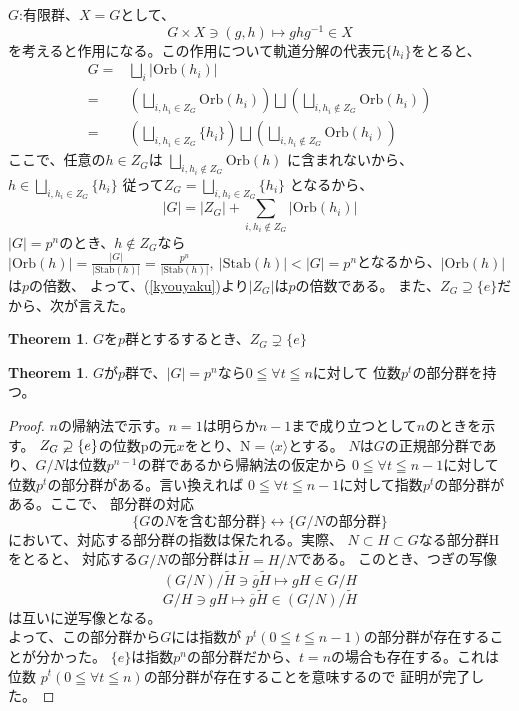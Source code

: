 \documentclass{ltjsarticle}
\theoremstyle{definition}
\newtheorem{theorem}[definition]{Theorem}
\begin{document}
$G$:有限群、$X=G$として、
\[ G\times X\ni (g,h)\longmapsto ghg^{-1}\in X\]
を考えると作用になる。この作用について軌道分解の代表元$\{h_i\}$をとると、
\begin{align*}
             G=&\bigsqcup _{i}\left|\mathrm{Orb}(h_i)\right|\\
              =&\left(\bigsqcup _{i,h_i\in Z_G}\mathrm{Orb}(h_i)\right)\bigsqcup
              \left(\bigsqcup _{i,h_i\notin Z_G}\mathrm{Orb}(h_i)\right)\\
              =&\left(\bigsqcup _{i,h_i\in Z_G}\{h_i\}\right)\bigsqcup 
              \left(\bigsqcup _{i,h_i\notin Z_G}\mathrm{Orb}(h_i)\right)
\end{align*}
ここで、任意の$h\in Z_{G}$は
$\bigsqcup _{i,h_i\notin Z_G}\mathrm{Orb}(h)$
に含まれないから、$h\in\bigsqcup _{i,h_i\in Z_G}\{h_i\}$
従って$Z_{G}=\bigsqcup _{i,h_i\in Z_G}\{h_i\}$
となるから、
\begin{equation}\label{kyouyaku}
    |G|=|Z_{G}|
              +\sum_{i,h_i\notin Z_G}\left|\mathrm{Orb}(h_i)\right|
\end{equation}
$|G|=p^n$のとき、$h\notin Z_G$なら
$\left|\mathrm{Orb}(h)\right|
=\frac{|G|}{|\mathrm{Stab}(h)|}=\frac{p^n}{|\mathrm{Stab}(h)|},\>
\left|\mathrm{Stab}(h)\right|< |G|=p^n$となるから、$|\mathrm{Orb}(h)|$は$p$の倍数、
よって、(\ref{kyouyaku})より$|Z_G|$は$p$の倍数である。
また、$Z_G\supseteq \{e\}$だから、次が言えた。
\begin{theorem}
  $G$を$p$群とするするとき、$Z_G\supsetneq \{e\}$
\end{theorem}
\begin{theorem}\label{pgrp}
  $G$が$p$群で、$|G|=p^n$なら$0\leqq\forall t\leqq n$に対して
  位数$p^t$の部分群を持つ。
\end{theorem}
\begin{proof}
 $n$の帰納法で示す。$n=1$は明らか$n-1$まで成り立つとして$n$のときを示す。
  $Z_G\varsupsetneq \{e\}$の位数pの元$x$をとり、$\mathrm{N}=\langle x\rangle$とする。
  $N$は$G$の正規部分群であり、$G/N$は位数$p^{n-1}$の群であるから帰納法の仮定から
  $0\leqq\forall t\leqq n-1$に対して位数$p^t$の部分群がある。言い換えれば
  $0\leqq\forall t\leqq n-1$に対して指数$p^t$の部分群がある。ここで、
  部分群の対応
  \[\{G\mathrm{の}N\mathrm{を含む部分群}\}
  \longleftrightarrow
   \{G/N\mathrm{の部分群}\}\]
において、対応する部分群の指数は保たれる。実際、
$N\subset H\subset G$なる部分群Hをとると、
対応する$G/N$の部分群は$\tilde{H}=H/N$である。
このとき、つぎの写像
\[\left(G/N\right)/\tilde{H}\ni
\overline{g}\tilde{H}\longmapsto gH\in G/H\]
\[G/H\ni gH\longmapsto\overline{g}\tilde{H}\in\left(G/N\right)/\tilde{H}\]
は互いに逆写像となる。\\
よって、この部分群から$G$には指数が
$p^t(0\leqq t\leqq n-1)$の部分群が存在することが分かった。
$\{e\}$は指数$p^n$の部分群だから、$t=n$の場合も存在する。これは位数
$p^t(0\leqq \forall t\leqq n)$の部分群が存在することを意味するので
証明が完了した。
\end{proof}
\end{document}
